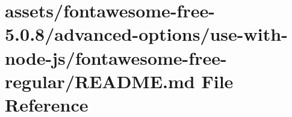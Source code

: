\hypertarget{fontawesome-free-5_80_88_2advanced-options_2use-with-node-js_2fontawesome-free-regular_2_r_e_a_d_m_e_8md}{}\section{assets/fontawesome-\/free-\/5.0.8/advanced-\/options/use-\/with-\/node-\/js/fontawesome-\/free-\/regular/\+R\+E\+A\+D\+ME.md File Reference}
\label{fontawesome-free-5_80_88_2advanced-options_2use-with-node-js_2fontawesome-free-regular_2_r_e_a_d_m_e_8md}
